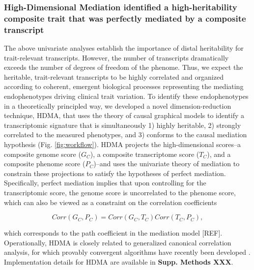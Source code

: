 \documentclass[
]{article}
\begin{document}
\subsubsection{High-Dimensional Mediation identified a high-heritability
composite trait that was perfectly mediated by a composite
transcript}\label{high-dimensional-mediation-identified-a-high-heritability-composite-trait-that-was-perfectly-mediated-by-a-composite-transcript}

The above univariate analyses establish the importance of distal
heritability for trait-relevant transcripts. However, the number of
transcripts dramatically exceeds the number of degrees of freedom of the
phenome. Thus, we expect the heritable, trait-relevant transcripts to be
highly correlated and organized according to coherent, emergent
biological processes representing the mediating endophenotypes driving
clinical trait variation. To identify these endophenotypes in a
theoretically principled way, we developed a novel dimension-reduction
technique, HDMA, that uses the theory of causal graphical models to
identify a transcriptomic signature that is simultaneously 1) highly
heritable, 2) strongly correlated to the measured phenotypes, and 3)
conforms to the causal mediation hypothesis (Fig. \ref{fig:workflow}).
HDMA projects the high-dimensional scores--a composite genome score
(\(G_C\)), a composite transcriptome score (\(T_C\)), and a composite
phenome score (\(P_C\))--and uses the univariate theory of mediation to
constrain these projections to satisfy the hypotheses of perfect
mediation. Specifically, perfect mediation implies that upon controlling
for the transcriptomic score, the genome score is uncorrelated to the
phenome score, which can also be viewed as a constraint on the
correlation coefficients

\begin{equation*}
Corr(G_C,P_C) = Corr(G_C,T_C)Corr(T_C,P_C),
\end{equation*}

which corresponds to the path coefficient in the mediation model
{[}REF{]}. Operationally, HDMA is closely related to generalized
canonical correlation analysis, for which provably convergent algorithms
have recently been developed \cite{rgcca}. Implementation details for
HDMA are available in \textbf{Supp. Methods XXX}.
\end{document}
